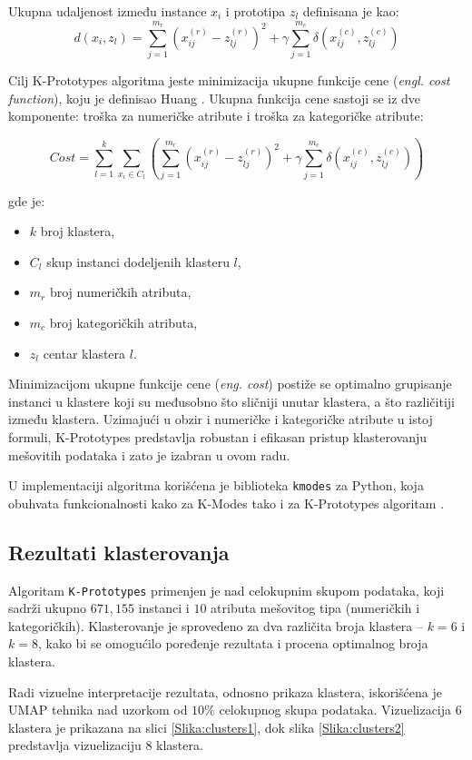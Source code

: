 \documentclass[a4paper,12pt]{article}
\begin{document}
Ukupna udaljenost između instance $x_i$ i prototipa $z_l$ definisana je kao:
\[
d(x_i, z_l) = \sum_{j=1}^{m_r} (x_{ij}^{(r)} - z_{lj}^{(r)})^2 + \gamma \sum_{j=1}^{m_c} \delta(x_{ij}^{(c)}, z_{lj}^{(c)})
\]

Cilj K-Prototypes algoritma jeste minimizacija ukupne funkcije cene (\textit{engl. cost function}), koju je definisao Huang \cite{huang1997clustering}. Ukupna funkcija cene sastoji se iz dve komponente: troška za numeričke atribute i troška za kategoričke atribute:

\[
Cost = \sum_{l=1}^{k} \sum_{x_i \in C_l} \left( \sum_{j=1}^{m_r} (x_{ij}^{(r)} - z_{lj}^{(r)})^2 + \gamma \sum_{j=1}^{m_c} \delta(x_{ij}^{(c)}, z_{lj}^{(c)}) \right)
\]

gde je:
\begin{itemize}
    \item $k$ broj klastera,
    \item $C_l$ skup instanci dodeljenih klasteru $l$,
    \item $m_r$ broj numeričkih atributa,
    \item $m_c$ broj kategoričkih atributa,
    \item $z_l$ centar klastera $l$.
\end{itemize}

Minimizacijom ukupne funkcije cene (\textit{eng. cost}) postiže se optimalno grupisanje instanci u klastere koji su međusobno što sličniji unutar klastera, a što različitiji između klastera. Uzimajući u obzir i numeričke i kategoričke atribute u istoj formuli, K-Prototypes predstavlja robustan i efikasan pristup klasterovanju mešovitih podataka i zato je izabran u ovom radu.

U implementaciji algoritma korišćena je biblioteka \texttt{kmodes} za Python, koja obuhvata funkcionalnosti kako za K-Modes tako i za K-Prototypes algoritam \cite{kmodeslib}.

\subsection{Rezultati klasterovanja}
Algoritam \texttt{K-Prototypes} primenjen je nad celokupnim skupom podataka, koji sadrži ukupno $671{,}155$ instanci i $10$ atributa mešovitog tipa (numeričkih i kategoričkih). Klasterovanje je sprovedeno za dva različita broja klastera -- $k=6$ i $k=8$, kako bi se omogućilo poređenje rezultata i procena optimalnog broja klastera.

Radi vizuelne interpretacije rezultata, odnosno prikaza klastera, iskorišćena je UMAP tehnika nad uzorkom od $10\%$ celokupnog skupa podataka. Vizuelizacija 6 klastera je prikazana na slici \ref{Slika:clusters1}, dok slika \ref{Slika:clusters2} predstavlja vizuelizaciju 8 klastera.
\end{document}
